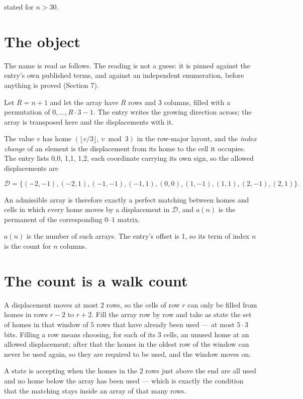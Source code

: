 \documentclass[11pt]{article}
\theoremstyle{definition}
\begin{document}
stated for $n > 30$.

\section{The object}

The name is read as follows. The reading is not a guess: it is pinned against the entry's own published terms, and against an independent enumeration, before anything is proved (Section 7).

Let $R = n + 1$ and let the array have $R$ rows and $3$ columns, filled with a permutation of $0,\dots,R\cdot3-1$. The entry writes the growing direction across; the array is transposed here and the displacements with it.

The value $v$ has home $(\lfloor v/3\rfloor,\ v \bmod 3)$ in the row-major layout, and the {\itshape index change} of an element is the displacement from its home to the cell it occupies. The entry lists 0,0, 1,1, 1,2, each coordinate carrying its own sign, so the allowed displacements are

\[\mathcal{D} = \{(-2,-1), (-2,1), (-1,-1), (-1,1), (0,0), (1,-1), (1,1), (2,-1), (2,1)\}.\]

An admissible array is therefore exactly a perfect matching between homes and cells in which every home moves by a displacement in $\mathcal{D}$, and $a(n)$ is the permanent of the corresponding $0$--$1$ matrix.

$a(n)$ is the number of such arrays. The entry's offset is 1, so its term of index $n$ is the count for $n$ columns.

\section{The count is a walk count}

A displacement moves at most $2$ rows, so the cells of row $r$ can only be filled from homes in rows $r-2$ to $r+2$. Fill the array row by row and take as state the set of homes in that window of $5$ rows that have already been used --- at most $5\cdot3$ bits. Filling a row means choosing, for each of its $3$ cells, an unused home at an allowed displacement; after that the homes in the oldest row of the window can never be used again, so they are required to be used, and the window moves on.

A state is accepting when the homes in the $2$ rows just above the end are all used and no home below the array has been used --- which is exactly the condition that the matching stays inside an array of that many rows.
\end{document}
